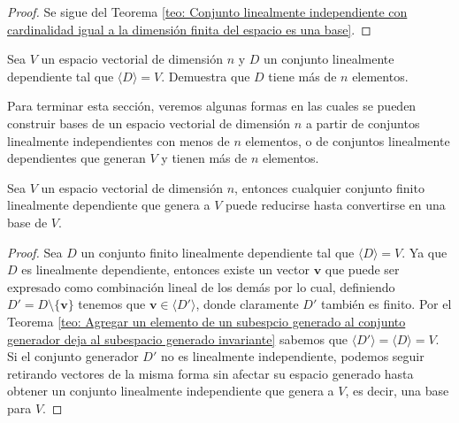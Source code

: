 \documentclass[notasLineal]{subfiles}
\begin{document}
\begin{proof}
    Se sigue del Teorema \ref{teo: Conjunto linealmente independiente con cardinalidad igual a la dimensión finita del espacio es una base}.
\end{proof}

\begin{Ejer}
    Sea $V$ un espacio vectorial de dimensión $n$ y $D$ un conjunto linealmente dependiente tal que $\langle D \rangle =V$. Demuestra que $D$ tiene más de $n$ elementos. 
\end{Ejer}

Para terminar esta sección, veremos algunas formas en las cuales se pueden construir bases de un espacio vectorial de dimensión $n$ a partir de conjuntos linealmente independientes con menos de $n$ elementos, o de conjuntos linealmente dependientes que generan $V$ y tienen más de $n$ elementos.

\begin{Teo}\label{teo: Conversión de conjunto generador en base para espacios de dimensión finita}
    Sea $V$ un espacio vectorial de dimensión $n$, entonces cualquier conjunto finito linealmente dependiente que genera a $V$ puede reducirse hasta convertirse en una base de $V$.
\end{Teo}

\begin{proof}
    Sea $D$ un conjunto finito linealmente dependiente tal que $\langle D \rangle =V$. Ya que $D$ es linealmente dependiente, entonces existe un vector $\mathbf{v}$ que puede ser expresado como combinación lineal de los demás por lo cual, definiendo $D'=D\setminus\{\mathbf{v}\}$ tenemos que $\mathbf{v}\in\langle D' \rangle$, donde claramente $D'$ también es finito. Por el Teorema \ref{teo: Agregar un elemento de un subespcio generado al conjunto generador deja al subespacio generado invariante} sabemos que $\langle D' \rangle =\langle D \rangle =V$. Si el conjunto generador $D'$ no es linealmente independiente, podemos seguir retirando vectores de la misma forma sin afectar su espacio generado hasta obtener un conjunto linealmente independiente que genera a $V$, es decir, una base para $V$.
\end{proof}
\end{document}
